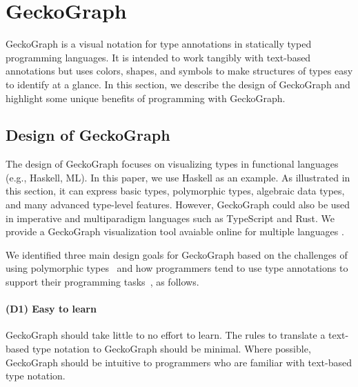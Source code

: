 \documentclass[preprint,12pt]{elsarticle}
\begin{document}
\section{GeckoGraph}

GeckoGraph is a visual notation for type annotations in statically typed programming languages. It is intended to work tangibly with text-based annotations but uses colors, shapes, and symbols to make structures of types easy to identify at a glance. In this section, we describe the design of GeckoGraph and highlight some unique benefits of programming with GeckoGraph.

\subsection{Design of GeckoGraph}
The design of GeckoGraph focuses on visualizing types in functional languages (e.g., Haskell, ML). In this paper, we use Haskell as an example. As illustrated in this section, it can express basic types, polymorphic types, algebraic data types, and many advanced type-level features. However, GeckoGraph could also be used in imperative and multiparadigm languages such as TypeScript and Rust. We provide a GeckoGraph visualization tool avaiable online for multiple languages \cite{Fu2025-ka}.

We identified three main design goals for GeckoGraph based on the challenges of using polymorphic types~\cite{Jun2000-ec, Jun2000-yu} and how programmers tend to use type annotations to support their programming tasks~\cite{Justin_Lubin2021-yy}, as follows. 

\paragraph{\textbf{(D1) Easy to learn}}\label{goal1} GeckoGraph should take little to no effort to learn. The rules to translate a text-based type notation to GeckoGraph should be minimal. Where possible, GeckoGraph should be intuitive to programmers who are familiar with text-based type notation.
\end{document}
